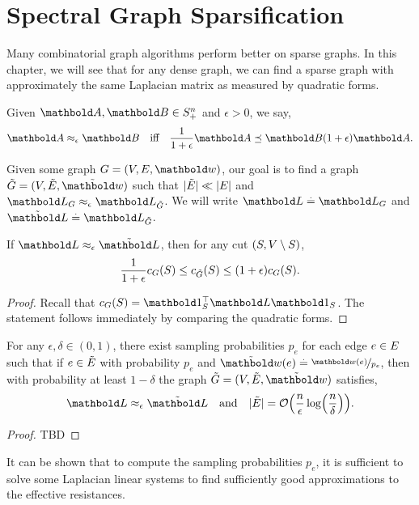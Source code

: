 
\chapter{Spectral Graph Sparsification}

Many combinatorial graph algorithms perform better on sparse graphs. In this chapter, we will see that for any dense graph, we can find a sparse graph with approximately the same Laplacian matrix as measured by quadratic forms.

\begin{defn} Given $\mA, \mB \in \sS_+^n$ and $\epsilon > 0$, we say, \begin{align}
    \mA \approx_\epsilon \mB \quad\text{iff}\quad \frac{1}{1+\epsilon}\mA \preceq \mB (1+\epsilon)\mA.
\end{align}
\end{defn}

Given some graph $G = (\sV,\sE,\vw)$, our goal is to find a graph $\Tilde{G} = (\sV,\Tilde{\sE},\Tilde{\vw})$ such that $|\Tilde{E}| \ll |E|$ and $\mL_G \approx_\epsilon \mL_{\Tilde{G}}$. We will write $\mL \defeq \mL_G$ and $\Tilde{\mL} \defeq \mL_{\Tilde{G}}$.

\begin{lem}
If $\mL \approx_\epsilon \Tilde{\mL}$, then for any cut $(S, V \setminus S)$, \begin{align}
    \frac{1}{1+\epsilon}c_G(S) \leq c_{\Tilde{G}}(S) \leq (1+\epsilon)c_G(S).
\end{align}
\end{lem}
\begin{proof}
Recall that $c_G(\sS) = \trans{\vOne_\sS}\mL\vOne_\sS$. The statement follows immediately by comparing the quadratic forms.
\end{proof}

\begin{thm}
For any $\epsilon, \delta \in (0,1)$, there exist sampling probabilities $p_e$ for each edge $e \in E$ such that if $e \in \Tilde{E}$ with probability $p_e$ and $\Tilde{\vw}(e) \defeq \nicefrac{\vw(e)}{p_e}$, then with probability at least $1-\delta$ the graph $\Tilde{G} = (\sV,\Tilde{\sE},\Tilde{\vw})$ satisfies,\cite{spielman2011graph} \begin{align*}
    \mL \approx_\epsilon \Tilde{\mL} \quad\text{and}\quad |\Tilde{\sE}| = \LandauO{\frac{n}{\epsilon} \log\parentheses*{\frac{n}{\delta}}}.
\end{align*}
\end{thm}
\begin{proof}
TBD
\end{proof}

\begin{rmk}
It can be shown that to compute the sampling probabilities $p_e$, it is sufficient to solve some Laplacian linear systems to find sufficiently good approximations to the effective resistances.
\end{rmk}